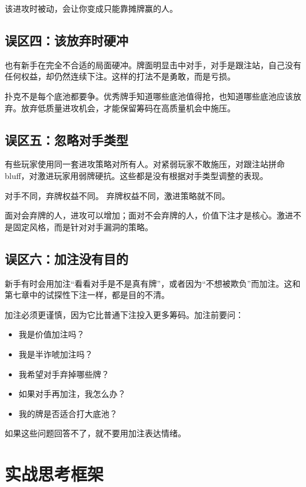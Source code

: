 该进攻时被动，会让你变成只能靠摊牌赢的人。

\subsection{误区四：该放弃时硬冲}

也有新手在完全不合适的局面硬冲。牌面明显击中对手，对手是跟注站，自己没有任何权益，却仍然连续下注。这样的打法不是勇敢，而是亏损。

扑克不是每个底池都要争。优秀牌手知道哪些底池值得抢，也知道哪些底池应该放弃。放弃低质量进攻机会，才能保留筹码在高质量机会中施压。

\subsection{误区五：忽略对手类型}

有些玩家使用同一套进攻策略对所有人。对紧弱玩家不敢施压，对跟注站拼命 bluff，对激进玩家用弱牌硬抗。这些都是没有根据对手类型调整的表现。

对手不同，弃牌权益不同。
弃牌权益不同，激进策略就不同。

面对会弃牌的人，进攻可以增加；面对不会弃牌的人，价值下注才是核心。激进不是固定风格，而是针对对手漏洞的策略。

\subsection{误区六：加注没有目的}

新手有时会用加注“看看对手是不是真有牌”，或者因为“不想被欺负”而加注。这和第七章中的试探性下注一样，都是目的不清。

加注必须更谨慎，因为它比普通下注投入更多筹码。加注前要问：

\begin{itemize}
\item 我是价值加注吗？
\item 我是半诈唬加注吗？
\item 我希望对手弃掉哪些牌？
\item 如果对手再加注，我怎么办？
\item 我的牌是否适合打大底池？
\end{itemize}

如果这些问题回答不了，就不要用加注表达情绪。

\section{实战思考框架}

